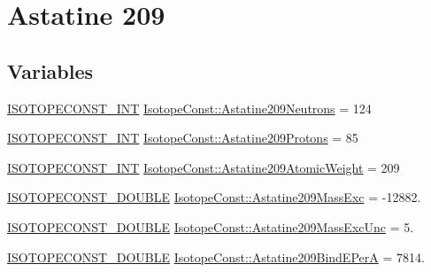 \hypertarget{group___isotope_const-_astatine-_at209}{}\section{Astatine 209}
\label{group___isotope_const-_astatine-_at209}
\subsection*{Variables}
\begin{DoxyCompactItemize}
\item 
\mbox{\hyperlink{group___isotope_const-_macros_ga5f18360b3e99483a35c32d789e62621c}{I\+S\+O\+T\+O\+P\+E\+C\+O\+N\+S\+T\+\_\+\+I\+NT}} \mbox{\hyperlink{group___isotope_const-_astatine-_at209_ga20a5cccc40f99f917a92238556ff379f}{Isotope\+Const\+::\+Astatine209\+Neutrons}} = 124
\item 
\mbox{\hyperlink{group___isotope_const-_macros_ga5f18360b3e99483a35c32d789e62621c}{I\+S\+O\+T\+O\+P\+E\+C\+O\+N\+S\+T\+\_\+\+I\+NT}} \mbox{\hyperlink{group___isotope_const-_astatine-_at209_gaaf62ead8aaf2b01b00becafc1467e1b4}{Isotope\+Const\+::\+Astatine209\+Protons}} = 85
\item 
\mbox{\hyperlink{group___isotope_const-_macros_ga5f18360b3e99483a35c32d789e62621c}{I\+S\+O\+T\+O\+P\+E\+C\+O\+N\+S\+T\+\_\+\+I\+NT}} \mbox{\hyperlink{group___isotope_const-_astatine-_at209_ga561a38fd20f1b991e9db81e6a3d21142}{Isotope\+Const\+::\+Astatine209\+Atomic\+Weight}} = 209
\item 
\mbox{\hyperlink{group___isotope_const-_macros_ga8f45a7272ce02c0b4c65c44636ed719a}{I\+S\+O\+T\+O\+P\+E\+C\+O\+N\+S\+T\+\_\+\+D\+O\+U\+B\+LE}} \mbox{\hyperlink{group___isotope_const-_astatine-_at209_gabd0e051979987c3f0561f8b13658cabf}{Isotope\+Const\+::\+Astatine209\+Mass\+Exc}} = -\/12882.
\item 
\mbox{\hyperlink{group___isotope_const-_macros_ga8f45a7272ce02c0b4c65c44636ed719a}{I\+S\+O\+T\+O\+P\+E\+C\+O\+N\+S\+T\+\_\+\+D\+O\+U\+B\+LE}} \mbox{\hyperlink{group___isotope_const-_astatine-_at209_ga84def1ed5330f9523f65525cc899e6a8}{Isotope\+Const\+::\+Astatine209\+Mass\+Exc\+Unc}} = 5.
\item 
\mbox{\hyperlink{group___isotope_const-_macros_ga8f45a7272ce02c0b4c65c44636ed719a}{I\+S\+O\+T\+O\+P\+E\+C\+O\+N\+S\+T\+\_\+\+D\+O\+U\+B\+LE}} \mbox{\hyperlink{group___isotope_const-_astatine-_at209_gaf267efc5eba022ae8ef32b0286e60234}{Isotope\+Const\+::\+Astatine209\+Bind\+E\+PerA}} = 7814.
\item 

\end{DoxyCompactItemize}
